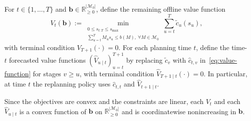 \documentclass[11pt]{article}
\newcommand{\R}{\mathbb{R}}
\newcommand{\1}{\mathbf{1}}
\newcommand{\mcal}{\mathcal{M}}
\begin{document}
For $t \in \{1,\dots,T\}$ and $\mathbf{b} \in \R_{\geq 0}^{|\mcal_{0}|}$, define the remaining offline value function
\begin{equation}
  \label{eq:value-function}
  V_t(\mathbf{b})
  := \min_{\substack{0 \leq s_{t:T} \leq s_{\max} \\
  \sum_{u=t}^{T} M_u s_u \leq b(M),\ \forall M \in \mcal_{0}}}
  \sum_{u=t}^{T} \tilde{c}_u(s_u),
\end{equation}
with terminal condition $V_{T+1}(\cdot) = 0$.
For each planning time $t$, define the time-$t$ forecasted value functions $(\hat{V}_{u \mid t})_{u=t}^{T+1}$ by replacing $\tilde{c}_v$ with $\hat{c}_{t,v}$ in~\eqref{eq:value-function} for stages $v \geq u$, with terminal condition $\hat{V}_{T+1 \mid t}(\cdot)=0$.
In particular, at time $t$ the replanning policy uses $\hat{c}_{t,t}$ and $\hat{V}_{t+1 \mid t}$.

Since the objectives are convex and the constraints are linear, each $V_t$ and each $\hat{V}_{u \mid t}$ is a convex function of $\mathbf{b}$ on $\R_{\geq 0}^{|\mcal_{0}|}$ and is coordinatewise nonincreasing in $\mathbf{b}$.
\end{document}
